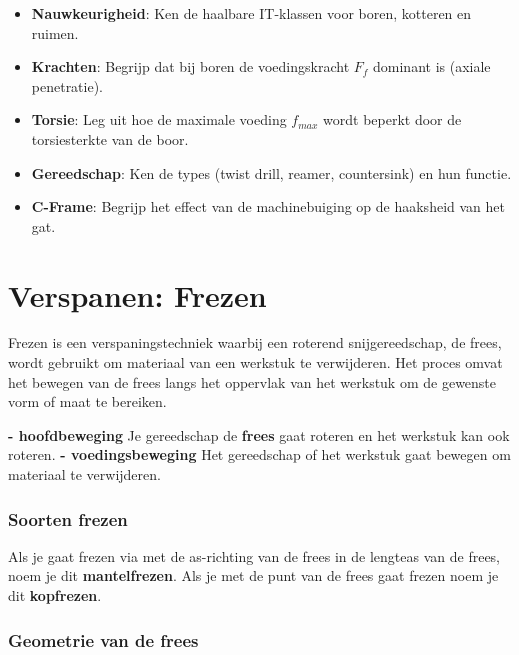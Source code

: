 \documentclass[a4paper,12pt,twoside]{report}
\begin{document}
\begin{warningbox}[title=EXAMEN CHECKLIST: BOREN]
    \begin{itemize}
        \item \textbf{Nauwkeurigheid}: Ken de haalbare IT-klassen voor boren, kotteren en ruimen.
        \item \textbf{Krachten}: Begrijp dat bij boren de voedingskracht $F_f$ dominant is (axiale penetratie).
        \item \textbf{Torsie}: Leg uit hoe de maximale voeding $f_{max}$ wordt beperkt door de torsiesterkte van de boor.
        \item \textbf{Gereedschap}: Ken de types (twist drill, reamer, countersink) en hun functie.
        \item \textbf{C-Frame}: Begrijp het effect van de machinebuiging op de haaksheid van het gat.
    \end{itemize}
\end{warningbox}

\chapter{Verspanen: Frezen}
\label{chap:Verspanen_Frezen}

Frezen is een verspaningstechniek waarbij een roterend snijgereedschap, de frees, wordt gebruikt om materiaal van een werkstuk te verwijderen.
Het proces omvat het bewegen van de frees langs het oppervlak van het werkstuk om de gewenste vorm of maat te bereiken.

\textbf{- hoofdbeweging}
\newline
Je gereedschap de \textbf{frees} gaat roteren en het werkstuk kan ook roteren.
\newline
\textbf{- voedingsbeweging}
\newline
Het gereedschap of het werkstuk gaat bewegen om materiaal te verwijderen.
\newline

\subsection{Soorten frezen}
Als je gaat frezen via met de as-richting van de frees in de lengteas van de frees, noem je dit \textbf{mantelfrezen}.
\newline
Als je met de punt van de frees gaat frezen noem je dit \textbf{kopfrezen}.

\subsection{Geometrie van de frees}
\end{document}
